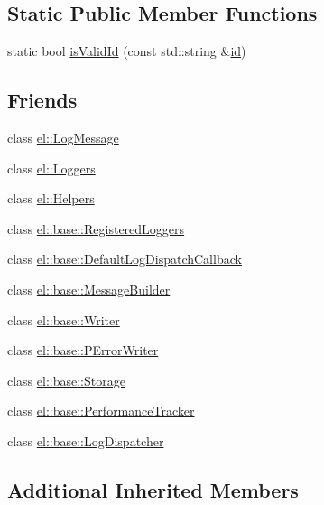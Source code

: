\subsection*{Static Public Member Functions}
\begin{DoxyCompactItemize}
\item 
static bool \hyperlink{classel_1_1_logger_af6cf4f266ceb65da9563afd3706f26d6}{is\+Valid\+Id} (const std\+::string \&\hyperlink{classel_1_1_logger_ae51a621df3c835f51f450134ba66f8ac}{id})
\end{DoxyCompactItemize}
\subsection*{Friends}
\begin{DoxyCompactItemize}
\item 
class \hyperlink{classel_1_1_logger_a22965b691242a9f61d443ba03fce3e35}{el\+::\+Log\+Message}
\item 
class \hyperlink{classel_1_1_logger_a6efe246b312d02731fb0e1d120c0331d}{el\+::\+Loggers}
\item 
class \hyperlink{classel_1_1_logger_a2fb8a2c02cbf86247f093c118bed877a}{el\+::\+Helpers}
\item 
class \hyperlink{classel_1_1_logger_a574ecee25e8d578f76060a95a2fe7c9e}{el\+::base\+::\+Registered\+Loggers}
\item 
class \hyperlink{classel_1_1_logger_a42b1de96d584ae4fecbfc2b9aff95052}{el\+::base\+::\+Default\+Log\+Dispatch\+Callback}
\item 
class \hyperlink{classel_1_1_logger_a81bbf6fe31fab133d182efa8367304f1}{el\+::base\+::\+Message\+Builder}
\item 
class \hyperlink{classel_1_1_logger_a7a728edbb2761d151832daa74d5b2736}{el\+::base\+::\+Writer}
\item 
class \hyperlink{classel_1_1_logger_a2a368b9be1b8d6a29d4bb92a11807f39}{el\+::base\+::\+P\+Error\+Writer}
\item 
class \hyperlink{classel_1_1_logger_acc1efd1b8a3fc5e0028dab98b02e550a}{el\+::base\+::\+Storage}
\item 
class \hyperlink{classel_1_1_logger_a6a4d7851e1984800be3c230f06a79528}{el\+::base\+::\+Performance\+Tracker}
\item 
class \hyperlink{classel_1_1_logger_a9b37b28ea1c5f8f862cc89f135711d92}{el\+::base\+::\+Log\+Dispatcher}
\end{DoxyCompactItemize}
\subsection*{Additional Inherited Members}


